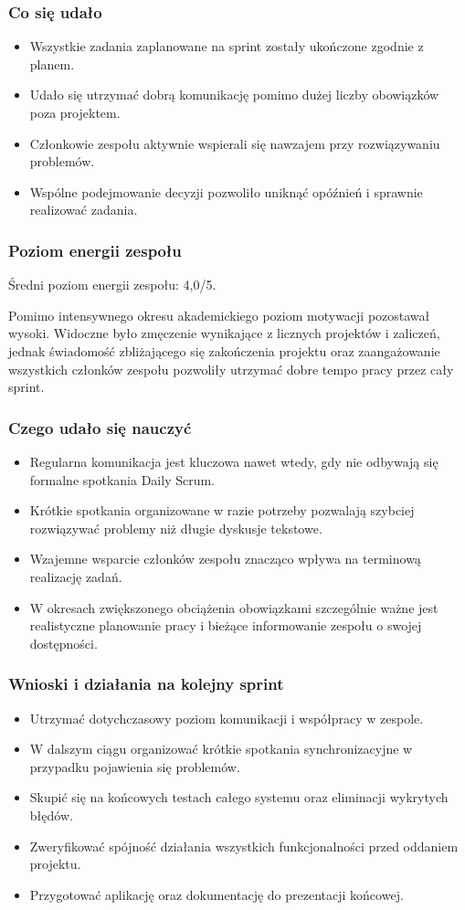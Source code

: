 \documentclass[12pt,a4paper]{article}
\begin{document}
\subsubsection*{Co się udało}
\begin{itemize}
\item Wszystkie zadania zaplanowane na sprint zostały ukończone zgodnie z planem.
\item Udało się utrzymać dobrą komunikację pomimo dużej liczby obowiązków poza projektem.
\item Członkowie zespołu aktywnie wspierali się nawzajem przy rozwiązywaniu problemów.
\item Wspólne podejmowanie decyzji pozwoliło uniknąć opóźnień i sprawnie realizować zadania.
\end{itemize}
\subsubsection*{Poziom energii zespołu}
Średni poziom energii zespołu: 4,0/5.

Pomimo intensywnego okresu akademickiego poziom motywacji pozostawał wysoki. Widoczne było zmęczenie wynikające z licznych projektów i zaliczeń, jednak świadomość zbliżającego się zakończenia projektu oraz zaangażowanie wszystkich członków zespołu pozwoliły utrzymać dobre tempo pracy przez cały sprint.

\subsubsection*{Czego udało się nauczyć}
\begin{itemize}
\item Regularna komunikacja jest kluczowa nawet wtedy, gdy nie odbywają się formalne spotkania Daily Scrum.
\item Krótkie spotkania organizowane w razie potrzeby pozwalają szybciej rozwiązywać problemy niż długie dyskusje tekstowe.
\item Wzajemne wsparcie członków zespołu znacząco wpływa na terminową realizację zadań.
\item W okresach zwiększonego obciążenia obowiązkami szczególnie ważne jest realistyczne planowanie pracy i bieżące informowanie zespołu o swojej dostępności.
\end{itemize}
\subsubsection*{Wnioski i działania na kolejny sprint}
\begin{itemize}
\item Utrzymać dotychczasowy poziom komunikacji i współpracy w zespole.
\item W dalszym ciągu organizować krótkie spotkania synchronizacyjne w przypadku pojawienia się problemów.
\item Skupić się na końcowych testach całego systemu oraz eliminacji wykrytych błędów.
\item Zweryfikować spójność działania wszystkich funkcjonalności przed oddaniem projektu.
\item Przygotować aplikację oraz dokumentację do prezentacji końcowej.
\end{itemize}
\end{document}
